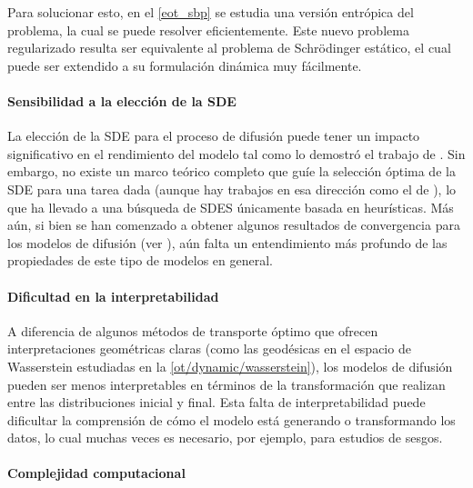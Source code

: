 Para solucionar esto, en el \autoref{eot_sbp} se estudia una versión entrópica del problema, la cual se puede resolver eficientemente. Este nuevo problema regularizado resulta ser equivalente al problema de Schrödinger estático, el cual puede ser extendido a su formulación dinámica muy fácilmente.

\paragraph{Sensibilidad a la elección de la SDE}

La elección de la SDE para el proceso de difusión puede tener un impacto significativo en el rendimiento del modelo tal como lo demostró el trabajo de \cite{song2021scorebased}. Sin embargo, no existe un marco teórico completo que guíe la selección óptima de la SDE para una tarea dada (aunque hay trabajos en esa dirección como el de \cite{karras2022elucidatingdesignspacediffusionbased}), lo que ha llevado a una búsqueda de SDES únicamente basada en heurísticas. Más aún, si bien se han comenzado a obtener algunos resultados de convergencia para los modelos de difusión (ver \cite{debortoli2023convergencedenoisingdiffusionmodels}), aún falta un entendimiento más profundo de las propiedades de este tipo de modelos en general.

\paragraph{Dificultad en la interpretabilidad}

A diferencia de algunos métodos de transporte óptimo que ofrecen interpretaciones geométricas claras (como las geodésicas en el espacio de Wasserstein estudiadas en la \autoref{ot/dynamic/wasserstein}), los modelos de difusión pueden ser menos interpretables en términos de la transformación que realizan entre las distribuciones inicial y final. Esta falta de interpretabilidad puede dificultar la comprensión de cómo el modelo está generando o transformando los datos, lo cual muchas veces es necesario, por ejemplo, para estudios de sesgos.

\paragraph{Complejidad computacional}

